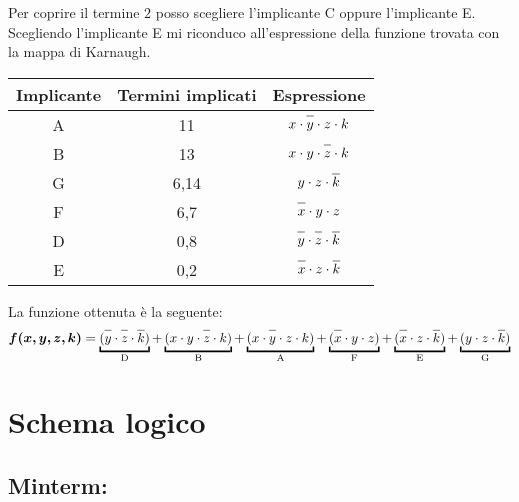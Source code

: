 \documentclass{article}
\newcommand*{\oline}[1]{\overline{#1\mathstrut}}
\begin{document}
\newpage

Per coprire il termine $2$ posso scegliere l'implicante C oppure l'implicante E. Scegliendo l'implicante E mi riconduco all'espressione della funzione trovata con la mappa di Karnaugh.
\begin{center}
  \begin{table}[h]
    \makegapedcells
    \centering
    {
      \begin{tabular}{|c|c|c|}
        \hline
        \textbf{Implicante} & \textbf{Termini implicati} & \textbf{Espressione} \\
        \hline
          A & 11 & $x \cdot \oline{y} \cdot z \cdot k$ \\
        \hline
          B & 13 & $x \cdot y \cdot \oline{z} \cdot k$ \\
        \hline
          G & 6,14 & $y \cdot z \cdot \oline{k}$ \\
        \hline
          F & 6,7 & $\oline{x} \cdot y \cdot z$ \\
        \hline
          D & 0,8 & $\oline{y} \cdot \oline{z} \cdot \oline{k}$ \\
        \hline
          E & 0,2 & $\oline{x} \cdot z \cdot \oline{k}$ \\
        \hline
      \end{tabular}
    }
  \end{table}
\end{center}

La funzione ottenuta è la seguente:
\begin{align*}
  \bm{f(x,y,z,k)} = \underbracket{(\oline{y} \cdot \oline{z} \cdot \oline{k})}_{\text{D}} + \underbracket{(x \cdot y \cdot \oline{z} \cdot k)}_{\text{B}} + \underbracket{(x \cdot \oline{y} \cdot z \cdot k)}_{\text{A}} + \underbracket{(\oline{x} \cdot y \cdot z)}_{\text{F}} + \underbracket{(\oline{x} \cdot z \cdot \oline{k})}_{\text{E}} + \underbracket{(y \cdot z \cdot \oline{k})}_{\text{G}}
\end{align*}

\newpage

\section{Schema logico}

\bigskip

\subsection*{Minterm:}
\end{document}
